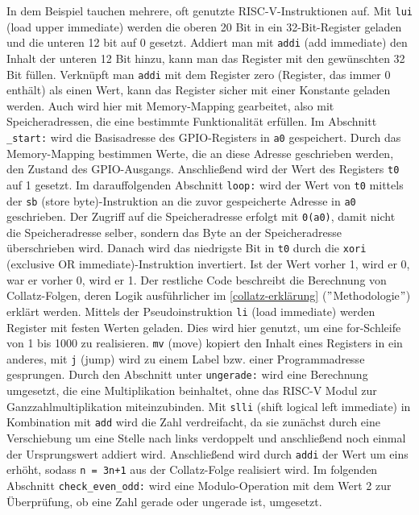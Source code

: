     In dem Beispiel tauchen mehrere, oft genutzte RISC-V-Instruktionen auf.
    Mit \verb|lui| (load upper immediate) werden die oberen 20 Bit in ein 32-Bit-Register geladen und die unteren 12 bit auf 0 gesetzt.
    Addiert man mit \verb|addi| (add immediate) den Inhalt der unteren 12 Bit hinzu, kann man das Register mit den gewünschten 32 Bit füllen.
    Verknüpft man \verb|addi| mit dem Register zero (Register, das immer 0 enthält) als einen Wert, kann das Register sicher mit einer Konstante geladen werden.
    Auch wird hier mit Memory-Mapping gearbeitet, also mit Speicheradressen, die eine bestimmte Funktionalität erfüllen.
    Im Abschnitt \verb|_start:| wird die Basisadresse des GPIO-Registers in \verb|a0| gespeichert.
    Durch das Memory-Mapping bestimmen Werte, die an diese Adresse geschrieben werden, den Zustand des GPIO-Ausgangs.
    Anschließend wird der Wert des Registers \verb|t0| auf 1 gesetzt.
    Im darauffolgenden Abschnitt \verb|loop:| wird der Wert von \verb|t0| mittels der \verb|sb| (store byte)-Instruktion an die zuvor gespeicherte Adresse in \verb|a0| geschrieben.
    Der Zugriff auf die Speicheradresse erfolgt mit \verb|0(a0)|, damit nicht die Speicheradresse selber, sondern das Byte an der Speicheradresse überschrieben wird.
    Danach wird das niedrigste Bit in \verb|t0| durch die \verb|xori| (exclusive OR immediate)-Instruktion invertiert.
    Ist der Wert vorher 1, wird er 0, war er vorher 0, wird er 1.
    Der restliche Code beschreibt die Berechnung von Collatz-Folgen, deren Logik ausführlicher im \cref{collatz-erklärung} (\("\)Methodologie\("\)) erklärt werden.
    Mittels der Pseudoinstruktion \verb|li| (load immediate) \parencite{riscv-pseudoinstructions} werden Register mit festen Werten geladen.
    Dies wird hier genutzt, um eine for-Schleife von 1 bis 1000 zu realisieren.
    \verb|mv| (move) kopiert den Inhalt eines Registers in ein anderes, mit \verb|j| (jump) wird zu einem Label bzw. einer Programmadresse gesprungen.
    Durch den Abschnitt unter \verb|ungerade:| wird eine Berechnung umgesetzt, die eine Multiplikation beinhaltet, ohne das RISC-V Modul zur Ganzzahlmultiplikation miteinzubinden.
    Mit \verb|slli| (shift logical left immediate) in Kombination mit \verb|add| wird die Zahl verdreifacht, da sie zunächst durch eine Verschiebung um eine Stelle nach links verdoppelt und anschließend noch einmal der Ursprungswert addiert wird.
    Anschließend wird durch \verb|addi| der Wert um eins erhöht, sodass \verb|n = 3n+1| aus der Collatz-Folge realisiert wird.
    Im folgenden Abschnitt \verb|check_even_odd:| wird eine Modulo-Operation mit dem Wert 2 zur Überprüfung, ob eine Zahl gerade oder ungerade ist, umgesetzt.
